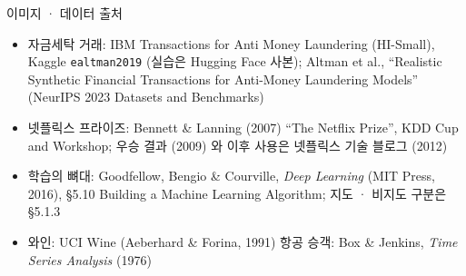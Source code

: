 \documentclass[aspectratio=169,11pt,t]{beamer}
\begin{document}
\begin{frame}{이미지 · 데이터 출처}
\vfill
\small
\begin{itemize}
\item 자금세탁 거래: IBM Transactions for Anti Money Laundering (HI-Small), Kaggle \texttt{ealtman2019} (실습은 Hugging Face 사본); Altman et al., ``Realistic Synthetic Financial Transactions for Anti-Money Laundering Models'' (NeurIPS 2023 Datasets and Benchmarks)
\item 넷플릭스 프라이즈: Bennett \& Lanning (2007) ``The Netflix Prize'', KDD Cup and Workshop; 우승 결과 (2009) 와 이후 사용은 넷플릭스 기술 블로그 (2012)
\item 학습의 뼈대: Goodfellow, Bengio \& Courville, \textit{Deep Learning} (MIT Press, 2016), \S 5.10 Building a Machine Learning Algorithm; 지도 · 비지도 구분은 \S 5.1.3\item 와인: UCI Wine (Aeberhard \& Forina, 1991) \quad 항공 승객: Box \& Jenkins, \textit{Time Series Analysis} (1976)
\end{itemize}
\vfill
{}
\end{frame}
\end{document}
